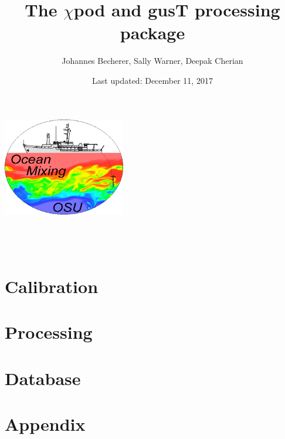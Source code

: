 \documentclass[12pt]{report}
\title{The $\chi$pod and gusT processing package}
\author{Johannes Becherer, Sally Warner, Deepak Cherian}
\date{Last updated: December 11, 2017}
\makeatletter
\def\makenewtitle{{
\thispagestyle{plain}
\centering
\includegraphics[width=0.4\textwidth]{figs/omg_logo.png} \\[23ex]
\vspace*{\fill}
{\Huge \@title }\\[4ex]
{\large  \@author}\\[4ex]
\@date\\
\vspace*{\fill}}}
\makeatother
\begin{document}
\pagestyle{fancy}

\makenewtitle
\tableofcontents

\part{Calibration}



\part{Processing}






\part{Database}


\appendix
\part{Appendix}




\end{document}
